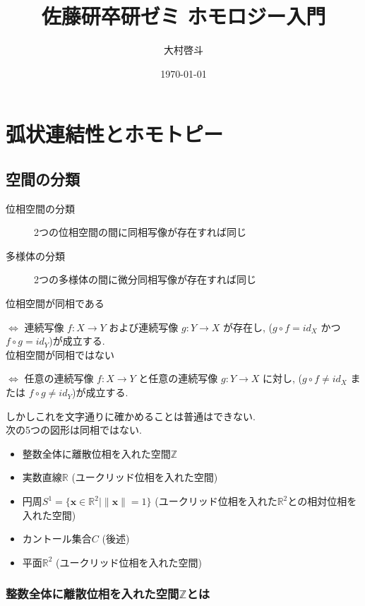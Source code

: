 \documentclass[i]{jsarticle}
\begin{document}
\title{佐藤研卒研ゼミ ホモロジー入門}
\author{大村啓斗}
\date{\today}
\maketitle

\section{弧状連結性とホモトピー}
\subsection{空間の分類}

\begin{description}
\item[位相空間の分類] 2つの位相空間の間に同相写像が存在すれば同じ
\item[多様体の分類] 2つの多様体の間に微分同相写像が存在すれば同じ
\end{description}

位相空間が同相である

$\iff$ 連続写像 $f: X \to Y$ および連続写像 $g: Y \to X$ が存在し, ($g \circ f = id_{X}$ かつ $f \circ g = id_{Y}$)が成立する. \\

位相空間が同相ではない

$\iff$ 任意の連続写像 $f: X \to Y$ と任意の連続写像 $g: Y \to X$ に対し, ($g \circ f \neq id_{X}$ または $f \circ g \neq id_{Y}$)が成立する.

しかしこれを文字通りに確かめることは普通はできない. \\

次の5つの図形は同相ではない.

\begin{itemize}\label{t1}
	\item 整数全体に離散位相を入れた空間$\mathbb{Z}$
	\item 実数直線$\mathbb{R}$ (ユークリッド位相を入れた空間)
	\item 円周$S^{1}=\{\bm{x} \in \mathbb{R}^2 \mid \|\bm{x}\|=1\}$ (ユークリッド位相を入れた$\mathbb{R}^{2}$との相対位相を入れた空間)
	\item カントール集合$C$ (後述)
	\item 平面$\mathbb{R}^{2}$ (ユークリッド位相を入れた空間)
\end{itemize}

\subsubsection*{整数全体に離散位相を入れた空間$\mathbb{Z}$とは}
\end{document}
